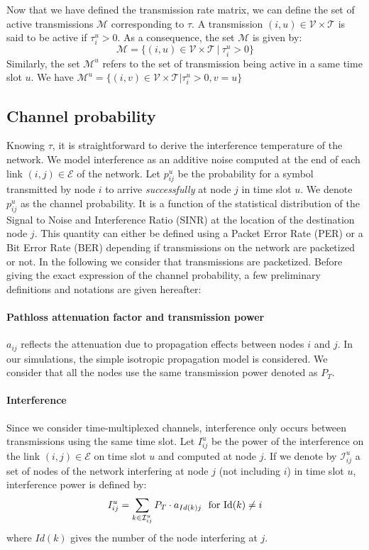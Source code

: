 \documentclass[a4paper]{article}
\newcommand{\power}{P_T}
\newcommand{\T}{\mathcal{T}}
\newcommand{\M}{\mathcal{M}}
\newcommand{\V}{\mathcal{V}}
\newcommand{\E}{\mathcal{E}}
\begin{document}
Now that we have defined the transmission rate matrix, we can define the set of active transmissions $\M$ corresponding to $\tau$. A transmission $(i,u) \in \V \times \T$ is said to be active if $\tau_i^u > 0$. As a consequence, the set $\M$ is given by:
\[
\M = \{(i,u) \in \V \times \T~ |~ \tau_i^u > 0\}
\]
Similarly, the set $\M^u$ refers to the set of transmission being active in a same time slot $u$. We have $\M^u = \{(i,v) \in \V \times \T | \tau_i^u > 0, v=u \}$

\subsection{Channel probability}
Knowing $\tau$, it is straightforward to derive the interference temperature of the network. We model interference as an additive noise computed at the end of each link $(i,j) \in \E$ of the network. 
Let $p_{ij}^u$ be the probability for a symbol transmitted by node $i$ to arrive \emph{successfully} at node $j$ in time slot $u$. We denote $p_{ij}^u$ as the channel probability.
It is a function of the statistical distribution of the Signal to Noise and Interference Ratio (SINR) at the location of the destination node $j$. 
This quantity can either be defined using a Packet Error Rate (PER) or a Bit Error Rate (BER) depending if transmissions on the network are packetized or not.  
In the following we consider that transmissions are packetized.
Before giving the exact expression of the channel probability, a few preliminary definitions and notations are given hereafter:

\paragraph*{Pathloss attenuation factor and transmission power}
$a_{ij}$ reflects the attenuation due to propagation effects between nodes $i$ and $j$. In our simulations, the simple isotropic propagation model is considered.
We consider that all the nodes use the same transmission power denoted as $\power$.



\paragraph*{Interference}
Since we consider time-multiplexed channels, interference only occurs between transmissions using the same time slot.
Let  $I_{ij}^u$ be the power of the interference on the link $(i,j) \in \E$ on time slot $u$ and computed at node $j$. 
If we denote by $\mathcal{I}_{ij}^u$ a set of nodes of the network interfering at node $j$ (not including $i$) in time slot $u$, interference power is defined by:
\begin{equation}
\label{eq:interf}
I_{ij}^u = \sum_{k \in \mathcal{I}_{ij}^u} \power \cdot a_{Id(k)j}~~{\rm for}~\mathrm{Id}(k) \neq i
\end{equation}
\noindent where $Id(k)$ gives the number of the node interfering at $j$.
 
\end{document}
